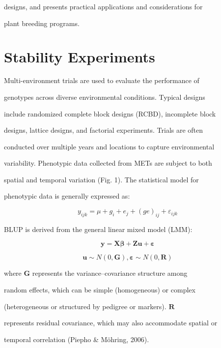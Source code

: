 \documentclass[10pt,twoside]{article}
\numberwithin{equation}{section}
\begin{document}
designs, and presents practical applications and considerations for

plant breeding programs.



\section{Stability Experiments}



Multi-environment trials are used to evaluate the performance of

genotypes across diverse environmental conditions. Typical designs

include randomized complete block designs (RCBD), incomplete block

designs, lattice designs, and factorial experiments. Trials are often

conducted over multiple years and locations to capture environmental

variability. Phenotypic data collected from METs are subject to both

spatial and temporal variation (Fig. 1). The statistical model for

phenotypic data is generally expressed as:



\[y_{ijk} = \mu + g_{i} + e_{j} + (ge)_{ij} + \varepsilon_{ijk}

\]



BLUP is derived from the general linear mixed model (LMM):



\[\mathbf{y} = \mathbf{X}\mathbf{\beta} + \mathbf{Zu} + \mathbf{\varepsilon}\mathbf{

}\]



\[\mathbf{u} \sim N(0,\mathbf{G}),\mathbf{\varepsilon} \sim N(0,\mathbf{R})\]



where \(\mathbf{G}\) represents the variance--covariance structure among

random effects, which can be simple (homogeneous) or complex

(heterogeneous or structured by pedigree or markers). \(\mathbf{R}\)

represents residual covariance, which may also accommodate spatial or

temporal correlation (Piepho \& Möhring, 2006).
\end{document}
